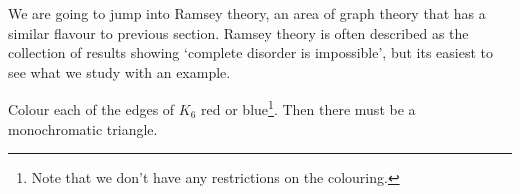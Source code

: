 \documentclass[a4paper]{scrartcl}
\begin{document}
We are going to jump into Ramsey theory, an area of graph theory that has a similar flavour to previous section. Ramsey theory is often described as the collection of results showing `complete disorder is impossible', but its easiest to see what we study with an example.

\begin{proposition}
	Colour each of the edges of $K_6$ red or blue\footnote{Note that we don't have any restrictions on the colouring.}. Then there must be a monochromatic triangle.
	\begin{center}
		


\begin{tikzpicture}[x=0.75pt,y=0.75pt,yscale=-1,xscale=1]


\end{tikzpicture}
\end{center}
\end{proposition}
\end{document}
